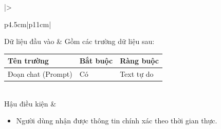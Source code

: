 \documentclass[12pt,a4paper]{report}
\begin{document}
\begin{longtable}{|>{\raggedright\arraybackslash\bfseries}p{4.5cm}|p{11cm}|}
Dữ liệu đầu vào & 
Gồm các trường dữ liệu sau:\newline
\vspace{0.1cm}
\begin{tabular}{|p{3.5cm}|p{2.5cm}|p{4cm}|}
\hline
\textbf{Tên trường} & \textbf{Bắt buộc} & \textbf{Ràng buộc} \\ \hline
Đoạn chat (Prompt) & Có & Text tự do \\ \hline
\end{tabular} \\ \hline
Hậu điều kiện & 
\begin{itemize}[leftmargin=*, nosep, topsep=0pt, partopsep=0pt]
    \item Người dùng nhận được thông tin chính xác theo thời gian thực.
\end{itemize} \\ \hline
\end{longtable}

\vspace{0.5cm}
\end{document}

